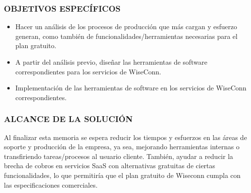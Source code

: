 \subsubsection{OBJETIVOS ESPECÍFICOS}
\begin{itemize}
    \item Hacer un análisis de los procesos de producción que más cargan y esfuerzo generan, como también de funcionalidades/herramientas necesarias para el plan gratuito.
    \item A partir del análisis previo, diseñar las herramientas de software correspondientes para los servicios de WiseConn.
    \item Implementación de las herramientas de software en los servicios de WiseConn correspondientes.
\end{itemize}

\subsubsection{ALCANCE DE LA SOLUCIÓN}
Al finalizar esta memoria se espera reducir los tiempos y esfuerzos en las áreas de soporte y producción de la empresa, ya sea, mejorando herramientas internas o transfiriendo tareas/procesos al usuario cliente. También, ayudar a reducir la brecha de cobros en servicios SaaS con alternativas gratuitas de ciertas funcionalidades, lo que permitiría que el plan gratuito de Wiseconn cumpla con las especificaciones comerciales.
